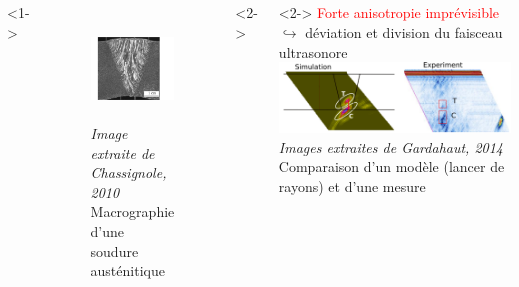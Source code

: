 \documentclass[10pt,xcolor=x11names,compress, notes=show]{beamer}%
\begin{document}
\subsection*{}
\begin{frame}{\insertsectionhead}
\vspace{-0.5cm}
\hspace{1cm}
	\begin{columns}[c]
			<1->
			\centering
			\begin{figure}
				\includegraphics[height=2.7cm]{./img/soudure1.png}\\
				{\tiny{ \itshape Image extraite de Chassignole, 2010} \\ \centering \scriptsize Macrographie d'une soudure austénitique  }
			\end{figure}
			<2->
			\hspace{-3cm}
			\vspace{2cm}
			<2->
			\hspace{-1cm}
			\textcolor{red}{Forte anisotropie imprévisible}\\
			$\hookrightarrow$ déviation et division du faisceau ultrasonore\\[0.2cm]
			\hspace{-0.5cm}
			\includegraphics[scale=0.5]{img/gardahaut.png}\\
			{\tiny{ \itshape Images extraites de Gardahaut, 2014} \\ \centering \scriptsize Comparaison d'un modèle (lancer de rayons) et d'une mesure }
				

\end{columns}
\end{frame}
\end{document}
